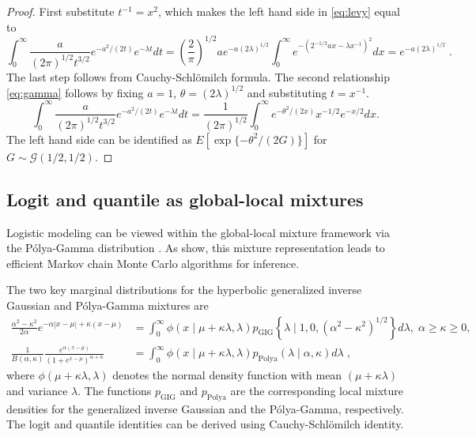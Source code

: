 \documentclass[ECP]{ejpecp} %
\def\CS{Cauchy-Schl\"omilch}
\def\PG{P{\'o}lya-Gamma}
\newcommand{\GammaRV}{\mathcal{G}}
\begin{document}
\begin{proof}
First substitute $t^{-1} = x^2$, which makes the left hand side in \eqref{eq:levy} equal to 
\[
  \int_{0}^{\infty} \frac{a}{(2 \pi)^{1/2} t^{3/2}} e^{-{a^2}/({2 t})} e^{-\lambda t} dt = \left(\frac{2}{\pi}\right)^{1/2}ae^{-a (2 \lambda)^{1/2}} 
  \int_0^{\infty} e^{-({2}^{-1/2} ax - \lambda x^{-1})^2} dx = e^{-a (2 \lambda)^{1/2}}\;.
\]
The last step follows from \CS{} formula.  The second relationship \eqref{eq:gamma} follows by fixing $a = 1$, $\theta = (2\lambda)^{1/2}$ and
substituting $t = x^{-1}$.
\[
\int_{0}^{\infty} \frac{a}{(2 \pi)^{1/2} t^{3/2}} e^{-{a^2}/({2 t})} e^{-\lambda t} dt = \frac{1}{(2 \pi)^{1/2}} \int_{0}^{\infty} e^{-{\theta^2}/({2x})} 
x^{-1/2} e^{-x/2} dx.
\]
The left hand side can be identified as $E \left[ \exp\{-\theta^2/(2G)\} \right]$ for $G \sim \GammaRV(1/2, 1/2)$. 
\end{proof}

\subsection{Logit and quantile as global-local mixtures}

Logistic modeling can be viewed within the global-local mixture framework via the \PG{} distribution \cite{polson_bayesian_2013}. As \cite{polson_bayesian_2013} show, this mixture representation leads to efficient Markov chain Monte Carlo algorithms for inference. 
\begin{proposition}
The two key marginal distributions for the hyperbolic generalized inverse Gaussian \cite{barndorff1982normal} and \PG{} mixtures are
\begin{align}
 \frac{\alpha^2 - \kappa^2}{2\alpha} e^{-\alpha|x-\mu| + \kappa (x-\mu)} &= \int_0^{\infty} \phi(x \mid \mu + \kappa \lambda, \lambda) p_{\mathrm{GIG}}\left\{ \lambda \mid 1,0, (\alpha^2 - \kappa^2)^{1/2}\right\} d\lambda, \; \alpha \geq \kappa \geq 0, \label{eq:GIG}\\
\frac{1}{B(\alpha,\kappa)} \frac{e^{\alpha (x-\mu)}}{(1+e^{x-\mu})^{\alpha + \kappa}}&= \int_0^{\infty} \phi(x \mid \mu + \kappa \lambda, \lambda)p_{\mathrm{Polya}}(\lambda \mid \alpha,\kappa)  d\lambda\;, \label{eq:polya}
\end{align}
where $\phi(\mu + \kappa \lambda, \lambda)$ denotes the normal density function with mean $(\mu + \kappa \lambda)$ and variance $\lambda$.  The functions $p_{\mathrm{GIG}}$ and $p_{\mathrm{Polya}}$ are the corresponding local mixture densities for the generalized inverse Gaussian and the \PG{}, respectively. The logit and quantile identities can be derived using \CS{} identity. 
\end{proposition}
\end{document}
